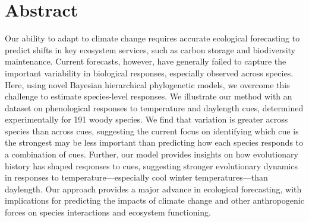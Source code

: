 \documentclass[11pt]{article}
\begin{document}
\clearpage




\section*{Abstract}
Our ability to adapt to climate change requires accurate ecological forecasting to predict shifts in key ecosystem services, such as carbon storage and biodiversity maintenance. Current forecasts, however, have generally failed to capture the important variability in biological responses, especially observed across species.  Here, using novel Bayesian hierarchical phylogenetic models, we overcome this challenge to estimate species-level responses.  We illustrate our method with an dataset on phenological responses to temperature and daylength cues, determined experimentally for 191 woody species.
We find that variation is greater across species than across cues, suggesting the current focus on identifying which cue is the strongest may be less important than predicting how each species responds to a combination of cues. Further, our model provides insights on how evolutionary history has shaped responses to cues, suggesting stronger evolutionary dynamics in responses to temperature---especially cool winter temperatures---than daylength. Our approach provides a major advance in ecological forecasting, with implications for predicting the impacts of climate change and other anthropogenic forces on species interactions and ecosystem functioning. 
\clearpage





\linenumbers
\end{document}
